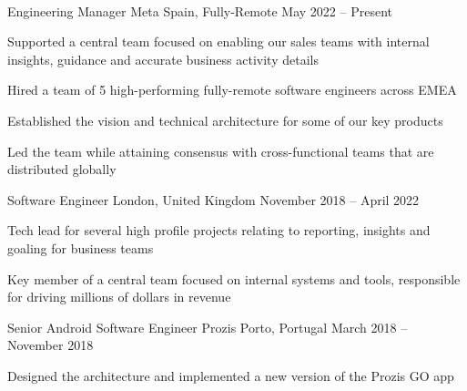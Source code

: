 \documentclass[]{awesome-cv}
\begin{document}

\begin{center}
	  \\

\end{center}
\vspace{-8mm}
\begin{cventries}

\vspace{-2mm}

\cventry
	{Engineering Manager}
	{Meta}
	{Spain, Fully-Remote}
	{May 2022 – Present}
	{\begin{cvitems}
		\item {Supported a central team focused on enabling our sales teams with internal insights, guidance and accurate business activity details}
		\item {Hired a team of 5 high-performing fully-remote software engineers across EMEA}
		\item {Established the vision and technical architecture for some of our key products}
		\item {Led the team while attaining consensus with cross-functional teams that are distributed globally}
	\end{cvitems}}


	\vspace{-6mm}
	\cventry
	{Software Engineer}
	{}
	{London, United Kingdom}
	{November 2018 – April 2022}
	{\begin{cvitems}
		\item {Tech lead for several high profile projects relating to reporting, insights and goaling for business teams}
		\item {Key member of a central team focused on internal systems and tools, responsible for driving millions of dollars in revenue}
	\end{cvitems}}

	\vspace{-4mm}
	\cventry
	{Senior Android Software Engineer}
	{Prozis}
	{Porto, Portugal}
	{March 2018 – November 2018}
	{\begin{cvitems}
		\item {Designed the architecture and implemented a new version of the Prozis GO app}
	\end{cvitems}}




\end{cventries}
\end{document}
